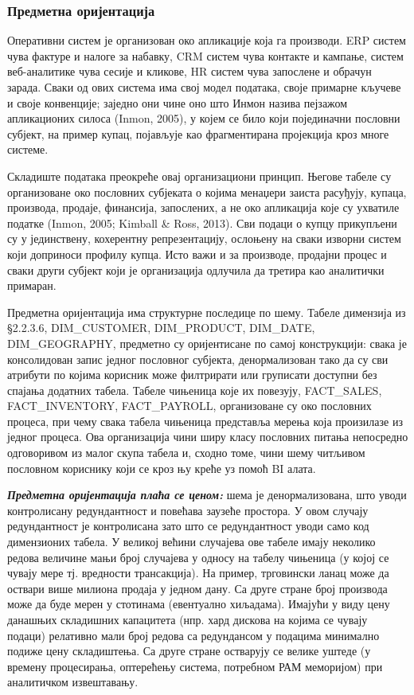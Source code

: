 \subsubsection{Предметна оријентација}
Оперативни систем је организован око апликације која га производи. ERP систем чува фактуре и налоге за набавку, CRM систем чува контакте и кампање, систем веб-аналитике чува сесије и кликове, HR систем чува запослене и обрачун зарада. Сваки од ових система има свој модел података, своје примарне кључеве и своје конвенције; заједно они чине оно што Инмон назива пејзажом апликационих силоса (Inmon, 2005), у којем се било који појединачни пословни субјект, на пример купац, појављује као фрагментирана пројекција кроз многе системе.

Складиште података преокреће овај организациони принцип. Његове табеле су организоване око пословних субјеката о којима менаџери заиста расуђују, купаца, производа, продаје, финансија, запослених, а не око апликација које су ухватиле податке (Inmon, 2005; Kimball \& Ross, 2013). Сви подаци о купцу прикупљени су у јединствену, кохерентну репрезентацију, ослоњену на сваки изворни систем који доприноси профилу купца. Исто важи и за производе, продајни процес и сваки други субјект који је организација одлучила да третира као аналитички примаран.

Предметна оријентација има структурне последице по шему. Табеле димензија из §2.2.3.6, DIM\_CUSTOMER, DIM\_PRODUCT, DIM\_DATE, DIM\_GEOGRAPHY, предметно су оријентисане по самој конструкцији: свака је консолидован запис једног пословног субјекта, денормализован тако да су сви атрибути по којима корисник може филтрирати или груписати доступни без спајања додатних табела. Табеле чињеница које их повезују, FACT\_SALES, FACT\_INVENTORY, FACT\_PAYROLL, организоване су око пословних процеса, при чему свака табела чињеница представља мерења која произилазе из једног процеса. Ова организација чини ширу класу пословних питања непосредно одговоривом из малог скупа табела и, сходно томе, чини шему читљивом пословном кориснику који се кроз њу креће уз помоћ BI алата.

\textbf{\textit{Предметна оријентација плаћа се ценом:}} шема је денормализована, што уводи контролисану редундантност и повећава заузеће простора. У овом случају редундантност је контролисана зато што се редундантност уводи само код димензионих табела. У великој већини случајева ове табеле имају неколико редова величине мањи број случајева у односу на табелу чињеница (у којој се чувају мере тј. вредности трансакција). На пример, трговински ланац може да оствари више милиона продаја у једном дану. Са друге стране број производа може да буде мерен у стотинама (евентуално хиљадама). Имајући у виду цену данашњих складишних капацитета (нпр. хард дискова на којима се чувају подаци) релативно мали број редова са редундансом у подацима минимално подиже цену складиштења. Са друге стране остварују се велике уштеде (у времену процесирања, оптерећењу система, потребном РАМ меморијом) при аналитичком извештавању.

